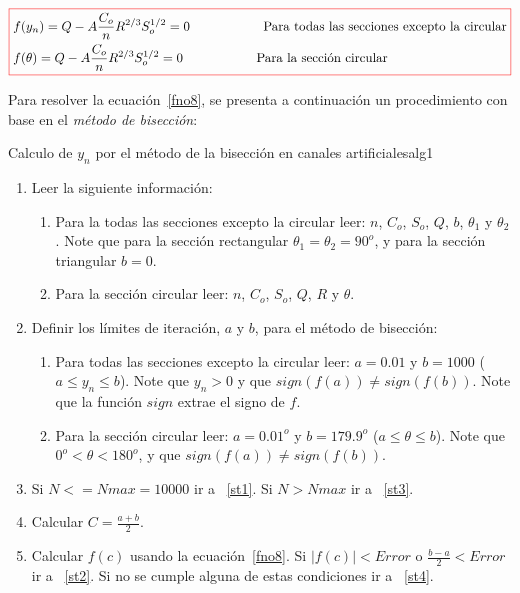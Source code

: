 \documentclass[11pt, oneside]{article}
\begin{document}
\begin{equation}
\color{red}\boxed{\color{black}
\begin{split}
& f(y_n) = Q - A\frac{C_o }{n} R^{2/3} S_o^{1/2} = 0 \hspace{2cm} \text{Para todas las secciones excepto la circular}\\
& f(\theta) = Q - A\frac{C_o }{n} R^{2/3} S_o^{1/2} = 0 \hspace{2cm} \text{Para la secci\'on circular}\\
\end{split}
}
\label{fno8}
\end{equation}

Para resolver la ecuaci\'on~\ref{fno8}, se presenta a continuaci\'on un procedimiento con base en el \emph{m\'etodo de bisecci\'on}:
\begin{alg}{Calculo de $y_n$ por el m\'etodo de la bisecci\'on en canales artificiales}{alg1}
\begin{enumerate}
\item Leer la siguiente información:

\begin{enumerate}
\item Para la todas las secciones excepto la circular leer: $n$, $C_o$, $S_o$, $Q$, $b$, $\theta_1$ y $\theta_2$. Note que para la secci\'on rectangular $\theta_1 = \theta_2 = 90^o$, y para la secci\'on triangular $b=0$.
\item Para la secci\'on circular leer: $n$, $C_o$, $S_o$, $Q$, $R$ y $\theta$.
\end{enumerate}

\item Definir los l\'imites de iteraci\'on, $a$ y $b$, para el m\'etodo de bisecci\'on:
\begin{enumerate}
\item Para todas las secciones excepto la circular leer: $a = 0.01$ y $b=1000$ ($a \le y_n \le b$). Note que $y_n > 0$ y que $sign(f(a)) \neq sign(f(b)) $. Note que la funci\'on $sign$ extrae el signo de $f$.
\item Para la secci\'on circular leer: $a=0.01^o$ y $b=179.9^o$ ($a \le \theta \le b$). Note que $ 0^o < \theta < 180^o $, y que $sign(f(a)) \neq sign(f(b)) $. 
\end{enumerate}

\item \label{st5} Si $N <= Nmax=10000$ ir a ~\ref{st1}. Si $N > Nmax$ ir a ~\ref{st3}.  
\item \label{st1} Calcular $C = \frac{a+b}{2}$.
\item Calcular $f(c)$ usando la ecuaci\'on~\ref{fno8}. Si $|f(c)|< Error$ o $\frac{b-a}{2} < Error$ ir a ~\ref{st2}. Si no se cumple alguna de estas  condiciones ir a ~\ref{st4}.


\end{enumerate}
\end{alg}
\end{document}
